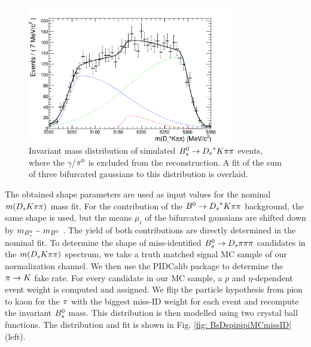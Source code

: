 \begin{figure}[h]
\includegraphics[height=8.cm,width=0.80\textwidth]{figs/Bs2DsstartKpipi.pdf}
\caption{Invariant mass distribution of simulated ${{B}^0_{s}}\rightarrow{\ensuremath{{D}_{s}}}^{*}{K}{\pi}{\pi}$ events, where the $\gamma$/${{\pi}^0}$ is excluded from the reconstruction. 
A fit of the sum of three bifurcated gaussians to this distribution is overlaid.}
\label{fig: BsDsstarKpipiMC}
\end{figure}

The obtained shape parameters are used as input values for the nominal $m({{D}_{s}}{K}{\pi}{\pi})$ mass fit. For the contribution of the ${{B}^0}\rightarrow{\ensuremath{{D}_{s}}}^{*}{K}{\pi}{\pi}$ background, the same shape is used, but the means $\mu_{i}$ of the bifurcated gaussians are shifted down by $m_{{{B}^0_{s}}} - m_{{{B}^0}}$ \cite{Agashe:2014kda}. The yield of both contributions are directly determined in the nominal fit. \newline
To determine the shape of miss-identified ${{B}^0_{s}}\rightarrow{\ensuremath{{D}_{s}}}{\ensuremath{\pi}}{\ensuremath{\pi}}{\ensuremath{\pi}}$ candidates in the $m({{D}_{s}}{K}{\pi}{\pi})$ spectrum, we take a truth matched signal MC sample of our normalization channel. 
We then use the PIDCalib package to determine the ${\pi}\rightarrow{\ensuremath{K}}$ fake rate. For every candidate in our MC sample, a $p$ and $\eta$-dependent event weight is computed and assigned. 
We flip the particle hypothesis from pion to kaon for the ${\pi}$ with the biggest miss-ID weight for each event and recompute the invariant ${{B}^0_{s}}$ mass. This distribution is then modelled using two crystal ball functions. 
The distribution and fit is shown in Fig. \ref{fig: BsDspipipiMCmissID}(left). 

